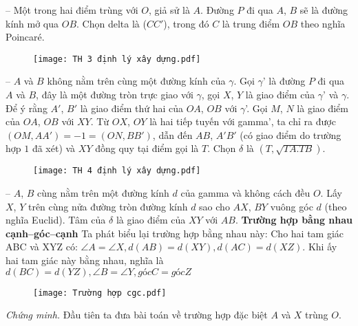 \documentclass{article}
\begin{document}
	\vskip 0.1cm
	-- Một trong hai điểm trùng với $O$, giả sử là $A$. Đường $P$ đi qua $A$, $B$ sẽ là đường kính mở qua $OB$. Chọn delta là ($CC'$), trong đó $C$ là trung điểm $OB$ theo nghĩa Poincaré. 
	\begin{figure}[H]
		\vspace*{-5pt}
		\centering
		\captionsetup{labelformat= empty, justification=centering}
		\texttt{[image: TH 3 định lý xây dựng.pdf]}
		\vspace*{-10pt}
	\end{figure}
	-- $A$ và $B$ không nằm trên cùng một đường kính của $\gamma$. Gọi $\gamma$' là đường $P$ đi qua $A$ và $B$, đây là một đường tròn trực giao với $\gamma$, gọi $X$, $Y$ là giao điểm của $\gamma$' và $\gamma$. Để ý rằng $A'$, $B'$ là giao điểm thứ hai của $OA$, $OB$ với $\gamma$'. Gọi $M$, $N$ là giao điểm của $OA$, $OB$ với $XY$. Từ $OX$, $OY$ là hai tiếp tuyến với gamma', ta chỉ ra được $(OM, AA') = -1 = (ON, BB')$, dẫn đến $AB$, $A'B'$ (có giao điểm do trường hợp $1$ đã xét) và $XY$ đồng quy tại điểm gọi là $T$. Chọn $\delta$ là $(T, \sqrt{TA.TB})$. 
	\begin{figure}[H]
		\vspace*{-5pt}
		\centering
		\captionsetup{labelformat= empty, justification=centering}
		\texttt{[image: TH 4 định lý xây dựng.pdf]}
		\vspace*{-10pt}
	\end{figure}
	-- $A$, $B$ cùng nằm trên một đường kính $d$ của gamma và không cách đều $O$. Lấy $X$, $Y$ trên cùng nửa đường tròn đường kính $d$ sao cho $AX$, $BY$ vuông góc $d$ (theo nghĩa Euclid). Tâm của $\delta$ là giao điểm của $XY$ với $AB$.
	\vskip 0.1cm
	\textbf{\color{lichsutoanhoc}Trường hợp bằng nhau cạnh--góc--cạnh}
	\vskip 0.1cm
	Ta phát biểu lại trường hợp bằng nhau này:
	Cho hai tam giác ABC và XYZ có: $ \angle A = \angle X, d(AB) = d(XY), d(AC) = d(XZ)$.
	Khi ấy hai tam giác này bằng nhau, nghĩa là $d(BC)  = d(YZ), \angle B = \angle Y, góc C = góc Z$
	\begin{figure}[H]
		\vspace*{-5pt}
		\centering
		\captionsetup{labelformat= empty, justification=centering}
		\texttt{[image: Trường hợp cgc.pdf]}
		\vspace*{-10pt}
	\end{figure}
	\textit{Chứng minh.} Đầu tiên ta đưa bài toán về trường hợp đặc biệt $A$ và $X$ trùng $O$.
\end{document}
